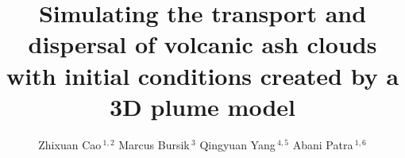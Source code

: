 \documentclass[utf8]{frontiersSCNS} %
\def\firstAuthorLast{Z. Cao {et~al.}} %
\def\Authors{Zhixuan Cao\,$^{1,2}$ Marcus Bursik\,$^{3}$  Qingyuan Yang\,$^{4,5}$ Abani Patra\,$^{1,6}$}
\begin{document}
\onecolumn
{}

\title[VATD Based on 3D Plume Model]{Simulating the transport and dispersal of volcanic ash clouds with initial conditions created by a 3D plume model} 

\author[\firstAuthorLast ]{\Authors} %
\address{} %
\correspondance{} %

\extraAuth{}%


\maketitle
\end{document}
